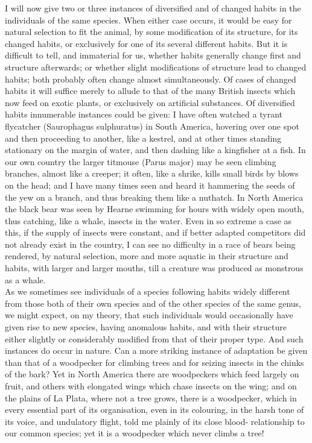 \indent I will now give two or three instances of diversified and of changed habits in the individuals of the same species. When either case occurs, it would be easy for natural selection to fit the animal, by some modification of its structure, for its changed habits, or exclusively for one of its several different habits. But it is difficult to tell, and immaterial for us, whether habits generally change first and structure afterwards; or whether slight modifications of structure lead to changed habits; both probably often change almost simultaneously. Of cases of changed habits it will suffice merely to allude to that of the many British insects which now feed on exotic plants, or exclusively on artificial substances. Of diversified habits innumerable instances could be given: I have often watched a tyrant flycatcher (Saurophagus sulphuratus) in South America, hovering over one spot and then proceeding to another, like a kestrel, and at other times standing stationary on the margin of water, and then dashing like a kingfisher at a fish. In our own country the larger titmouse (Parus major) may be seen climbing branches, almost like a creeper; it often, like a shrike, kills small birds by blows on the head; and I have many times seen and heard it hammering the seeds of the yew on a branch, and thus breaking them like a nuthatch. In North America the black bear was seen by Hearne swimming for hours with widely open mouth, thus catching, like a whale, insects in the water. Even in so extreme a case as this, if the supply of insects were constant, and if better adapted competitors did not already exist in the country, I can see no difficulty in a race of bears being rendered, by natural selection, more and more aquatic in their structure and habits, with larger and larger mouths, till a creature was produced as monstrous as a whale.\\
\indent As we sometimes see individuals of a species following habits widely different from those both of their own species and of the other species of the same genus, we might expect, on my theory, that such individuals would occasionally have given rise to new species, having anomalous habits, and with their structure either slightly or considerably modified from that of their proper type. And such instances do occur in nature. Can a more striking instance of adaptation be given than that of a woodpecker for climbing trees and for seizing insects in the chinks of the bark? Yet in North America there are woodpeckers which feed largely on fruit, and others with elongated wings which chase insects on the wing; and on the plains of La Plata, where not a tree grows, there is a woodpecker, which in every essential part of its organisation, even in its colouring, in the harsh tone of its voice, and undulatory flight, told me plainly of its close blood- relationship to our common species; yet it is a woodpecker which never climbs a tree!\\
